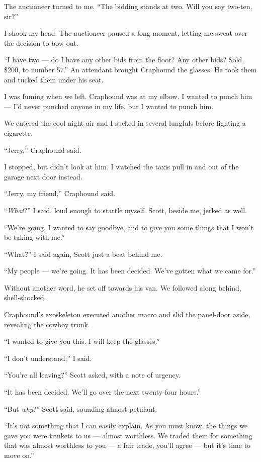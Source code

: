 The auctioneer turned to me.
``The bidding stands at two. Will you say two-ten, sir?''

I shook my head. The auctioneer paused a long moment, letting me
sweat over the decision to bow out.

``I have two --- do I have any other bids from the floor? Any other bids? 
Sold, \$200, to number 57.''
An attendant brought Craphound the glasses. He took them and tucked
them under his seat.

\tb

I was fuming when we left. Craphound was at my elbow. I wanted to
punch him --- I'd never punched anyone in my life, but I wanted to
punch him.

We entered the cool night air and I sucked in several lungfuls
before lighting a cigarette.

``Jerry,'' Craphound said.

I stopped, but didn't look at him. I watched the taxis pull in and
out of the garage next door instead.

``Jerry, my friend,'' Craphound said.

``\emph{What}?'' I said, loud enough to startle myself. Scott,
beside me, jerked as well.

``We're going. I wanted to say goodbye, and to give you some things 
that I won't be taking with me.''

``What?'' I said again, Scott just a beat behind me.

``My people --- we're going. 
It has been decided. We've gotten what we came for.''

Without another word, he set off towards his van. We followed along
behind, shell-shocked.

Craphound's exoskeleton executed another macro and slid the
panel-door aside, revealing the cowboy trunk.

``I wanted to give you this. I will keep the glasses.''

``I don't understand,'' I said.

``You're all leaving?'' Scott asked, with a note of urgency.

``It has been decided. We'll go over the next twenty-four hours.''

``But \emph{why}?'' Scott said, sounding almost petulant.

``It's not something that I can easily explain. As you must know, 
the things we gave you were trinkets to us --- almost worthless. 
We traded them for something that was almost worthless to 
you --- a fair trade, you'll agree --- but it's time to move on.''

